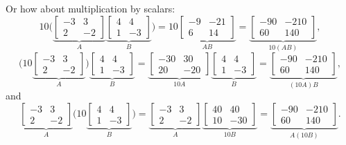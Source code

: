 \begin{example}
Or how about multiplication by scalars:
\begin{equation*}
10
\biggl(
\underbrace{
\begin{bmatrix}
-3 & 3 \\ 2 & -2
\end{bmatrix}
}_A
\underbrace{
\begin{bmatrix}
4 & 4 \\ 1 & -3
\end{bmatrix}
}_B
\biggr)
=
10
\underbrace{
\begin{bmatrix}
-9 & -21 \\ 6 & 14
\end{bmatrix}
}_{A B} 
=
\underbrace{
\begin{bmatrix}
-90 & -210 \\ 60 & 140
\end{bmatrix}
}_{10 (AB)} ,
\end{equation*}
\begin{equation*}
\biggl(
10
\underbrace{
\begin{bmatrix}
-3 & 3 \\ 2 & -2
\end{bmatrix}
}_A
\biggr)
\underbrace{
\begin{bmatrix}
4 & 4 \\ 1 & -3
\end{bmatrix}
}_B
=
\underbrace{
\begin{bmatrix}
-30 & 30 \\ 20 & -20
\end{bmatrix}
}_{10 A}
\underbrace{
\begin{bmatrix}
4 & 4 \\ 1 & -3
\end{bmatrix}
}_B
=
\underbrace{
\begin{bmatrix}
-90 & -210 \\ 60 & 140
\end{bmatrix}
}_{(10 A)B} ,
\end{equation*}
and
\begin{equation*}
\underbrace{
\begin{bmatrix}
-3 & 3 \\ 2 & -2
\end{bmatrix}
}_A
\biggl(
10
\underbrace{
\begin{bmatrix}
4 & 4 \\ 1 & -3
\end{bmatrix}
}_B
\biggr)
=
\underbrace{
\begin{bmatrix}
-3 & 3 \\ 2 & -2
\end{bmatrix}
}_{A}
\underbrace{
\begin{bmatrix}
40 & 40 \\ 10 & -30
\end{bmatrix}
}_{10B}
=
\underbrace{
\begin{bmatrix}
-90 & -210 \\ 60 & 140
\end{bmatrix}
}_{A(10B)} .
\end{equation*}
\end{example}

